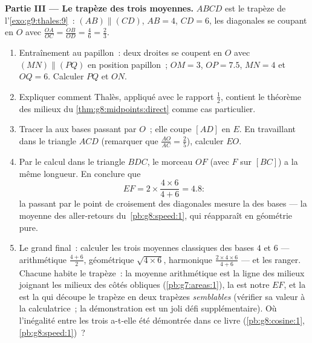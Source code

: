 \begin{problem}
\medskip
\noindent\textbf{Partie III --- Le trapèze des trois moyennes.}
$ABCD$ est le trapèze de l'\cref{exo:g9:thales:9}~:
$(AB) \parallel (CD)$, $AB = 4$, $CD = 6$, les diagonales se coupant
en $O$ avec $\frac{OA}{OC} = \frac{OB}{OD} = \frac{4}{6} =
\frac23$.
\begin{enumerate}[resume]
  \item Entraînement au papillon~: deux droites se coupent en $O$
        avec $(MN) \parallel (PQ)$ en position papillon~; $OM = 3$,
        $OP = 7.5$, $MN = 4$ et $OQ = 6$. Calculer $PQ$ et $ON$.
  \item Expliquer comment Thalès, appliqué avec le rapport
        $\frac12$, contient le théorème des milieux du
        \cref{thm:g8:midpoints:direct} comme cas particulier.
  \item Tracer la  aux bases passant par $O$~; elle coupe
        $[AD]$ en $E$. En travaillant dans le triangle $ACD$
        (remarquer que $\frac{AO}{AC} = \frac25$), calculer $EO$.
  \item Par le calcul  dans le triangle $BDC$, le morceau
        $OF$ (avec $F$ sur $[BC]$) a la même longueur. En conclure
        que
        \[
        EF = 2 \times \frac{4 \times 6}{4 + 6} = 4.8 :
        \]
        la  passant par le point de croisement des
        diagonales mesure la \emph{} des bases ---
        la moyenne des aller-retours du~\cref{pb:g8:speed:1}, qui
        réapparaît en géométrie pure.
  \item Le grand final~: calculer les trois moyennes classiques des
        bases $4$ et $6$ --- arithmétique $\frac{4+6}{2}$,
        géométrique $\sqrt{4 \times 6}$, harmonique
        $\frac{2 \times 4 \times 6}{4 + 6}$ --- et les ranger.
        Chacune habite le trapèze~: la moyenne arithmétique est la
        ligne des milieux joignant les milieux des côtés obliques
        (\cref{pb:g7:areas:1}), la  est notre
         $EF$, et la  est la  qui
        découpe le trapèze en deux trapèzes \emph{semblables}
        (vérifier sa valeur à la calculatrice~; la démonstration est
        un joli défi supplémentaire). Où l'inégalité entre les trois
        a-t-elle été démontrée dans ce livre
        (\cref{pb:g8:cosine:1}, \cref{pb:g8:speed:1})~?
\end{enumerate}
\end{problem}
